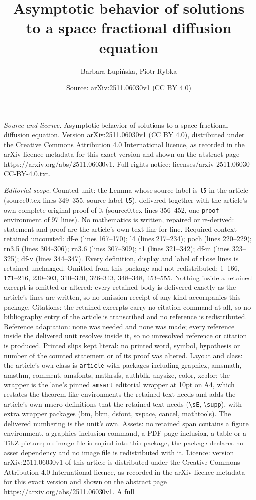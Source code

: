\documentclass[10pt,a4paper]{amsart}
\title[Asymptotic behavior of solutions to a space fractional diffu]{Asymptotic behavior of solutions to a space fractional diffusion equation}
\author{Barbara {\L}upi\'nska, Piotr Rybka}
\date{Source: arXiv:2511.06030v1 (CC BY 4.0)}
\begin{document}
\maketitle

\noindent\emph{Source and licence.} Asymptotic behavior of solutions to a space fractional diffusion equation. Version arXiv:2511.06030v1 (CC BY 4.0), distributed under the Creative Commons Attribution 4.0 International licence, as recorded in the arXiv licence metadata for this exact version and shown on the abstract page https://arxiv.org/abs/2511.06030v1. Full rights notice: licenses/arxiv-2511.06030-CC-BY-4.0.txt.\par\smallskip

\noindent\textit{Editorial scope.} Counted unit: the Lemma whose source label is \texttt{l5} in the article (source0.tex lines 349--355, source label \texttt{l5}), delivered together with the article's own complete original proof of it (source0.tex lines 356--452, one \texttt{proof} environment of 97 lines). No mathematics is written, repaired or re-derived: statement and proof are the article's own text line for line. Required context retained uncounted: df-e (lines 167--170); l4 (lines 217--234); poch (lines 220--229); rn3.5 (lines 304--306); rn3.6 (lines 307--309); t1 (lines 321--342); df-m (lines 323--325); df-v (lines 344--347). Every definition, display and label of those lines is retained unchanged. Omitted from this package and not redistributed: 1--166, 171--216, 230--303, 310--320, 326--343, 348--348, 453--555. Nothing inside a retained excerpt is omitted or altered: every retained body is delivered exactly as the article's lines are written, so no omission receipt of any kind accompanies this package. Citations: the retained excerpts carry no citation command at all, so no bibliography entry of the article is transcribed and no reference is redistributed. Reference adaptation: none was needed and none was made; every reference inside the delivered unit resolves inside it, so no unresolved reference or citation is produced. Printed slips kept literal: no printed word, symbol, hypothesis or number of the counted statement or of its proof was altered. Layout and class: the article's own class is \texttt{article} with packages including graphicx, amsmath, amsthm, comment, amsfonts, mathrsfs, authblk, anysize, color, xcolor; the wrapper is the lane's pinned \texttt{amsart} editorial wrapper at 10pt on A4, which restates the theorem-like environments the retained text needs and adds the article's own macro definitions that the retained text needs (\texttt{\textbackslash sE}, \texttt{\textbackslash supp}), with extra wrapper packages (bm, bbm, dsfont, xspace, cancel, mathtools). The delivered numbering is the unit's own. Assets: no retained span contains a figure environment, a graphics-inclusion command, a PDF-page inclusion, a table or a TikZ picture; no image file is copied into this package, the package declares no asset dependency and no image file is redistributed with it. Licence: version arXiv:2511.06030v1 of this article is distributed under the Creative Commons Attribution 4.0 International licence, as recorded in the arXiv licence metadata for this exact version and shown on the abstract page https://arxiv.org/abs/2511.06030v1. A full 
\end{document}
